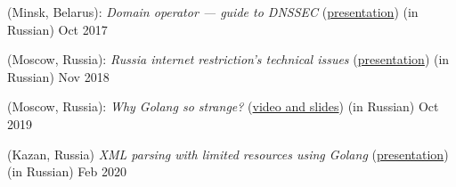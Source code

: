 %
 (Minsk, Belarus): \textit{Domain operator --- guide to DNSSEC} (\href{https://www.slideshare.net/schors/enog14-dnssec}{presentation}) (in Russian) \hfill Oct 2017

%
 (Moscow, Russia): \textit{Russia internet restriction's technical issues} (\href{https://www.slideshare.net/schors/ss-123038251}{presentation}) (in Russian) \hfill Nov 2018

 (Moscow, Russia): \textit{Why Golang so strange?} (\href{https://golangconf.ru/2019/abstracts/5753}{video and slides}) (in Russian) \hfill Oct 2019

 (Kazan, Russia) \textit{XML parsing with limited resources using Golang}  (\href{https://www.slideshare.net/schors/xml-vds}{presentation}) (in Russian) \hfill Feb 2020

